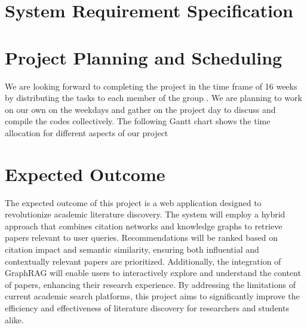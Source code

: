 \documentclass[a4paper,12pt]{article}
\begin{document}
\section{System Requirement Specification}
\newpage

\section{Project Planning and Scheduling}
We are looking forward to completing the project in the time frame of 16 weeks by
distributing the tasks to each member of the group . We are planning to work on our own
on the weekdays and gather on the project day to discuss and compile the codes
collectively. The following Gantt chart shows the time allocation for different aspects of
our project
\newpage

\section{Expected Outcome}
The expected outcome of this project is a web application designed to revolutionize
academic literature discovery. The system will employ a hybrid approach that combines
citation networks and knowledge graphs to retrieve papers relevant to user queries.
Recommendations will be ranked based on citation impact and semantic similarity,
ensuring both influential and contextually relevant papers are prioritized.
Additionally, the integration of GraphRAG will enable users to interactively
explore and understand the content of papers, enhancing their research experience.
By addressing the limitations of current academic search platforms, this project aims
to significantly improve the efficiency and effectiveness of literature discovery
for researchers and students alike.
\newpage

\printbibliography
\newpage
\end{document}
